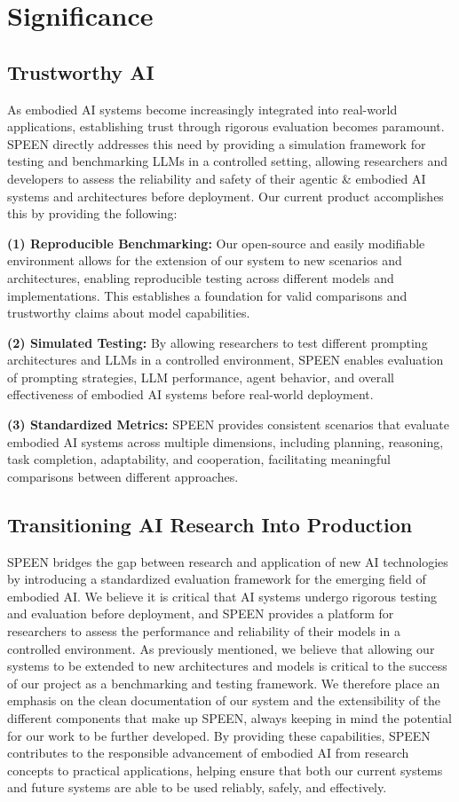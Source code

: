 \documentclass{article}
\begin{document}
\section{Significance}
\subsection{Trustworthy AI}
As embodied AI systems become increasingly integrated into real-world applications, establishing trust through rigorous evaluation becomes paramount.
SPEEN directly addresses this need by providing a simulation framework for testing and benchmarking LLMs in a controlled setting, allowing researchers and developers to assess the reliability and safety of their agentic \& embodied AI systems and architectures before deployment.
Our current product accomplishes this by providing the following: 

\textbf{(1) Reproducible Benchmarking:} Our open-source and easily modifiable environment allows for the extension of our system to new scenarios and architectures, enabling reproducible testing across different models and implementations.
This establishes a foundation for valid comparisons and trustworthy claims about model capabilities.

\textbf{(2) Simulated Testing:} By allowing researchers to test different prompting architectures and LLMs in a controlled environment, SPEEN enables evaluation of prompting strategies, LLM performance, agent behavior, and overall effectiveness of embodied AI systems before real-world deployment.

\textbf{(3) Standardized Metrics:} SPEEN provides consistent scenarios that evaluate embodied AI systems across multiple dimensions, including planning, reasoning, task completion, adaptability, and cooperation, facilitating meaningful comparisons between different approaches.

\subsection{Transitioning AI Research Into Production}
SPEEN bridges the gap between research and application of new AI technologies by introducing a standardized evaluation framework for the emerging field of embodied AI.
We believe it is critical that AI systems undergo rigorous testing and evaluation before deployment, and SPEEN provides a platform for researchers to assess the performance and reliability of their models in a controlled environment.
As previously mentioned, we believe that allowing our systems to be extended to new architectures and models is critical to the success of our project as a benchmarking and testing framework.
We therefore place an emphasis on the clean documentation of our system and the extensibility of the different components that make up SPEEN, always keeping in mind the potential for our work to be further developed.
By providing these capabilities, SPEEN contributes to the responsible advancement of embodied AI from research concepts to practical applications, helping ensure that both our current systems and future systems are able to be used reliably, safely, and effectively.
\end{document}

